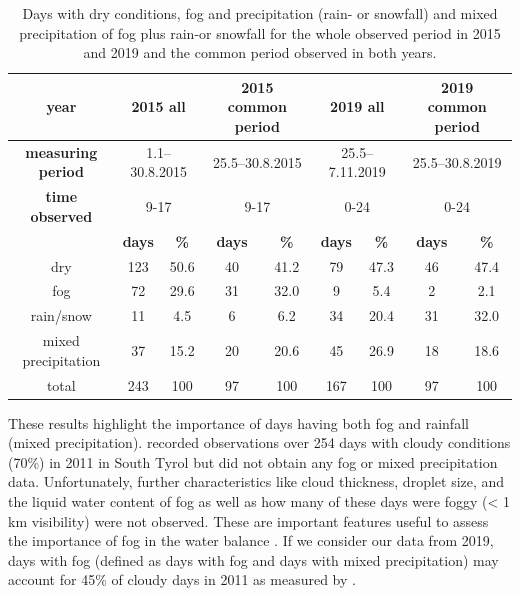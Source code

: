 \documentclass[10pt,letterpaper]{article}
\begin{document}
\begin{table}[!h]
\caption{Days with dry conditions, fog and precipitation (rain- or snowfall) and mixed precipitation of fog plus rain-or snowfall for the whole observed period in 2015 and 2019 and the common period observed in both years.}
\label{tab02}
   \centering
\setlength\tabcolsep{0pt}
\begin{tabular*}{\linewidth}{@{\extracolsep{\fill}} ccccccccc }
\toprule
\bf{year} & \multicolumn{2}{c}{2015 all} & \multicolumn{2}{c}{2015 common period} & \multicolumn{2}{c}{2019 all} & \multicolumn{2}{c}{2019 common period} \\
\midrule
\bf{measuring period} & \multicolumn{2}{c}{1.1--30.8.2015} & \multicolumn{2}{c}{25.5--30.8.2015} & \multicolumn{2}{c}{25.5--7.11.2019} & \multicolumn{2}{c}{25.5--30.8.2019} \\
\midrule
\bf{time observed} & \multicolumn{2}{c}{9-17} & \multicolumn{2}{c}{9-17} & \multicolumn{2}{c}{0-24} & \multicolumn{2}{c}{0-24} \\
\midrule
& \textbf{days} & \textbf{\%} & \textbf{days} & \textbf{\%} & \textbf{days} & \textbf{\%} & \textbf{days} & \textbf{\%} \\
\midrule
	dry & 123 & 50.6 & 40 & 41.2 & 79 & 47.3 & 46 & 47.4 \\
	fog & 72 & 29.6 & 31 & 32.0 & 9 & 5.4 & 2 & 2.1 \\
	rain/snow & 11 & 4.5 & 6 & 6.2 & 34 & 20.4 & 31 & 32.0 \\
	mixed precipitation & 37 & 15.2 & 20 & 20.6 & 45 & 26.9 & 18 & 18.6 \\
	\midrule
	total & 243 & 100 & 97 & 100 & 167 & 100 & 97 & 100 \\
\bottomrule
\end{tabular*}
\end{table} 

These results highlight the importance of days having both fog and rainfall (mixed precipitation). \cite{wagner2015} recorded observations over 254 days with cloudy conditions (70\%) in 2011 in South Tyrol but did not obtain any fog or mixed precipitation data. Unfortunately, further characteristics like cloud thickness, droplet size, and the liquid water content of fog as well as how many of these days were foggy (< 1 km visibility) were not observed. These are important features useful to assess the importance of fog in the water balance \cite{Frumau}. If we consider our data from 2019, days with fog (defined as days with fog and days with mixed precipitation) may account for 45\% of cloudy days in 2011 as measured by \cite{wagner2015}. 
\end{document}
